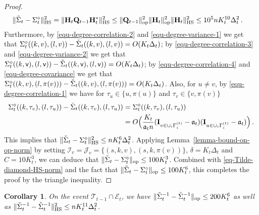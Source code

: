 \documentclass[11pt]{article}
\newtheorem{Corollary}[Theorem]{Corollary}
\numberwithin{equation}{section}
\begin{document}
\begin{proof}
\begin{align}
    & \| \Tilde{\Sigma}_{t} - \Sigma^{\diamond}_{t} \|_{\mathrm{HS}}^2 = \| \mathbf{H}_{t} \mathbf{Q}_{t-1} \mathbf{H}_{t}^{*} \|_{\mathrm{HS}}^2 \leq \| \mathbf{Q}_{t-1} \|_{\mathrm{op}}^2  \| \mathbf{H}_{t} \|_{\mathrm{op}}^2 \| \mathbf{H}_{t} \|_{\mathrm{HS}}^2 \leq 10^5 n K_{t}^{10} \Delta_{t}^2 \,.
\end{align}
Furthermore, by \eqref{equ-degree-correlation-2} and \eqref{equ-degree-variance-1} we get that $\Sigma^{\diamond}_{t}((k,v),(l,v)) - \Check{\Sigma}_{t}((k,v),(l,v)) = O(K_{t} \Delta_{t})$; by \eqref{equ-degree-correlation-3} and \eqref{equ-degree-variance-2} we get that  $\Sigma^{\diamond}_{t}((k,\mathsf{v}),(l,\mathsf{v})) - \Check{\Sigma}_{t}((k,\mathsf{v}),(l,\mathsf{v})) = O(K_{t} \Delta_{t})$; by \eqref{equ-degree-correlation-4} and \eqref{equ-degree-covariance} we get that $\Sigma^{\diamond}_{t}((k,v),(l,\pi(v))) - \Check{\Sigma}_{t}((k,v),(l,\pi(v))) = O(K_{t} \Delta_{t})$. Also, for $u \neq v$, by \eqref{equ-degree-correlation-1} we have for $\tau_u \in \{u, \pi(u)\}$ and $\tau_v \in \{v, \pi(v)\}$
\begin{align*}
     \Sigma^{\diamond}_{t}((k,\tau_v),(l, \tau_u)) - \Check{\Sigma}_{t}((k, \tau_v),(l, \tau_u))& = \Sigma^{\diamond}_{t}((k, \tau_v),(l, \tau_u))
    \\
    &= O \Big( \frac{K_t}{\mathfrak{a}_t n} (\mathbf{I}_{ v \in \cup_{i} \Gamma^{(t)}_i } - \mathfrak{a}_t ) (\mathbf{I}_{ u \in \cup_{i} \Gamma^{(t)}_i } - \mathfrak{a}_t ) \Big) \,.
\end{align*}
This implies that $\| \Check{\Sigma}_{t} - \Sigma^{\diamond}_{t} \|_{\mathrm{HS}}^2 \leq n K_{t}^{6} \Delta_{t}^2$. Applying Lemma~\ref{lemma-bound-on-op-norm} by setting $\mathcal{I}_v = \mathcal{J}_v = \{ (s,k,v),(s,k,\pi(v)) \}$, $\delta=K_t \Delta_t$ and $C = 10 K_t^3$, we can deduce that $\| \Check{\Sigma}_{t} - \Sigma^{\diamond}_{t} \|_{\mathrm{op}} \leq 100 K_{t}^3 $. Combined with \eqref{eq-Tilde-diamond-HS-norm} and the fact that $\| \Tilde{\Sigma}_{t} - \Sigma^{\diamond}_{t} \|_{\mathrm{op}} \leq 100K_{t}^6$, this completes the proof by the triangle inequality.
\end{proof}
\begin{Corollary} \label{corollary-2-HS-norm-W-inverse-minus-V-inverse}
On the event $\mathcal T_{t-1}\cap \mathcal E_t$, we have $\| \Tilde{\Sigma}_{t}^{-1} - \Check{\Sigma}_{t}^{-1} \|_{\mathrm{op}} \leq 200 K_{t}^{6}$ as well as $ \| \Tilde{\Sigma}_{t}^{-1} - \Check{\Sigma}_{t}^{-1} \|^2_{\mathrm{HS}} \leq n K_{t}^{11} \Delta_{t}^2$.
\end{Corollary}
\end{document}
